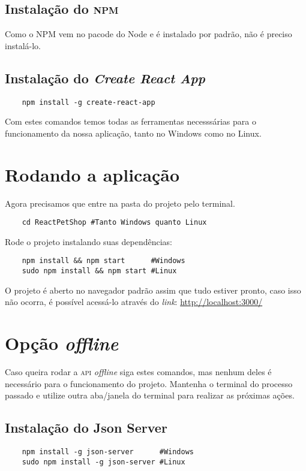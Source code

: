 \subsection{Instalação do \textsc{npm}}
Como o NPM vem no pacode do Node e é instalado por padrão, não é preciso
instalá-lo.

\subsection{Instalação do \emph{Create React App}}
\begin{verbatim}
	npm install -g create-react-app
\end{verbatim}

Com estes comandos temos todas as ferramentas necesssárias para o funcionamento
da nossa aplicação, tanto no Windows como no Linux.

\section{Rodando a aplicação}
Agora precisamos que entre na pasta do projeto pelo terminal.

\begin{verbatim}
	cd ReactPetShop #Tanto Windows quanto Linux
\end{verbatim}

Rode o projeto instalando suas dependências:
\begin{verbatim}
	npm install && npm start      #Windows
	sudo npm install && npm start #Linux
\end{verbatim}

O projeto é aberto no navegador padrão assim que tudo estiver pronto, caso isso
não ocorra, é possível acessá-lo através do \emph{link}:
\href{http://localhost:3000/}{http://localhost:3000/}

\section{Opção \emph{offline}}
\label{sec:offline}
Caso queira rodar a \textsc{api} \emph{offline} siga estes comandos, mas nenhum
deles é necessário para o funcionamento do projeto. Mantenha o terminal do
processo passado e utilize outra aba/janela do terminal para realizar as
próximas ações.

\subsection{Instalação do Json Server}
\begin{verbatim}
	npm install -g json-server      #Windows
	sudo npm install -g json-server #Linux
\end{verbatim}

